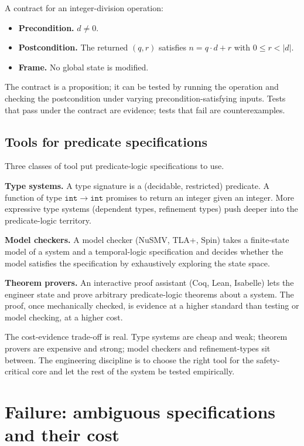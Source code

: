 A contract for an integer-division operation:
\begin{itemize}[leftmargin=*]
  \item \textbf{Precondition.} $d \neq 0$.
  \item \textbf{Postcondition.} The returned $(q, r)$ satisfies $n = q \cdot d + r$ with $0 \leq r < |d|$.
  \item \textbf{Frame.} No global state is modified.
\end{itemize}

The contract is a proposition; it can be tested by running the operation and checking the postcondition under varying precondition-satisfying inputs. Tests that pass under the contract are evidence; tests that fail are counterexamples.

\subsection{Tools for predicate specifications}

Three classes of tool put predicate-logic specifications to use.

\textbf{Type systems.} A type signature is a (decidable, restricted) predicate. A function of type $\mathtt{int} \to \mathtt{int}$ promises to return an integer given an integer. More expressive type systems (dependent types, refinement types) push deeper into the predicate-logic territory.

\textbf{Model checkers.} A model checker (NuSMV, TLA+, Spin) takes a finite-state model of a system and a temporal-logic specification and decides whether the model satisfies the specification by exhaustively exploring the state space.

\textbf{Theorem provers.} An interactive proof assistant (Coq, Lean, Isabelle) lets the engineer state and prove arbitrary predicate-logic theorems about a system. The proof, once mechanically checked, is evidence at a higher standard than testing or model checking, at a higher cost.

The cost-evidence trade-off is real. Type systems are cheap and weak; theorem provers are expensive and strong; model checkers and refinement-types sit between. The engineering discipline is to choose the right tool for the safety-critical core and let the rest of the system be tested empirically.

\section{Failure: ambiguous specifications and their cost}

